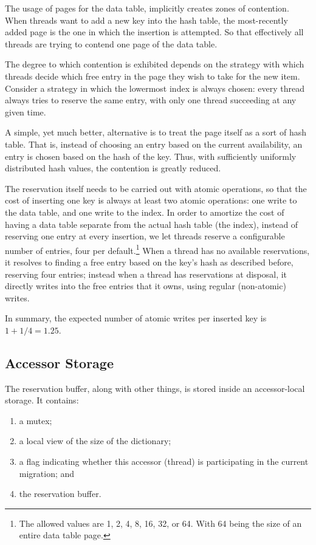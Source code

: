 The usage of pages for the data table, implicitly creates zones of contention.
When threads want to add a new key into the hash table, the most-recently added page is the one in which the insertion is attempted.
So that effectively all threads are trying to contend one page of the data table.

The degree to which contention is exhibited depends on the strategy with which threads decide which free entry in the page they wish to take for the new item.
Consider a strategy in which the lowermost index is always chosen: every thread always tries to reserve the same entry, with only one thread succeeding at any given time.

A simple, yet much better, alternative is to treat the page itself as a sort of hash table.
That is, instead of choosing an entry based on the current availability, an entry is chosen based on the hash of the key.
Thus, with sufficiently uniformly distributed hash values, the contention is greatly reduced.

The reservation itself needs to be carried out with atomic operations, so that the cost of inserting one key is always at least two atomic operations: one write to the data table, and one write to the index.
In order to amortize the cost of having a data table separate from the actual hash table (the index), instead of reserving one entry at every insertion, we let threads reserve a configurable number of entries, four per default.\footnote{%
	The allowed values are 1, 2, 4, 8, 16, 32, or 64.
	With 64 being the size of an entire data table page.
}
When a thread has no available reservations, it resolves to finding a free entry based on the key's hash as described before, reserving four entries; instead when a thread has reservations at disposal, it directly writes into the free entries that it owns, using regular (non-atomic) writes.

In summary, the expected number of atomic writes per inserted key is $1 + 1/4 = 1.25$.


\subsection{Accessor Storage}\label{subsec:accessor-storage}

The reservation buffer, along with other things, is stored inside an accessor-local storage.
It contains:
\begin{enumerate}
	\item a mutex;
	\item a local view of the size of the dictionary;
	\item a flag indicating whether this accessor (thread) is participating in the current migration; and
	\item the reservation buffer.
\end{enumerate}

